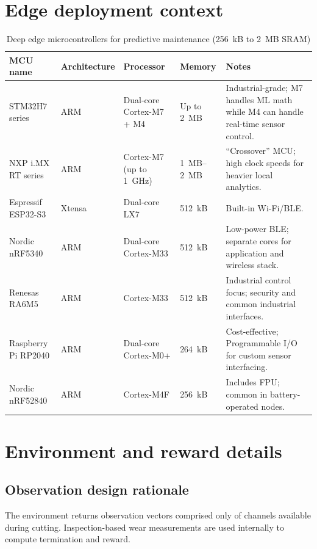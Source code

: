 \documentclass[sn-basic]{sn-jnl} %
\begin{document}
\begin{appendices}

\section{Edge deployment context}
\label{app:edge_context}

\begin{table}[htbp]
	\centering
	\caption{Deep edge microcontrollers for predictive maintenance (256~kB to 2~MB SRAM)}
	\label{tab:deep_edge_mcus}
	\renewcommand{\arraystretch}{1.3}
	\begin{tabular}{@{} l l l l p{5.5cm} @{}}
		\toprule
		\textbf{MCU name} & \textbf{Architecture} & \textbf{Processor} & \textbf{Memory} & \textbf{Notes} \\
		\midrule
		STM32H7 series & ARM & Dual-core Cortex-M7 + M4 & Up to 2~MB & Industrial-grade; M7 handles ML math while M4 can handle real-time sensor control. \\
		NXP i.MX RT series & ARM & Cortex-M7 (up to 1~GHz) & 1~MB--2~MB & ``Crossover'' MCU; high clock speeds for heavier local analytics. \\
		Espressif ESP32-S3 & Xtensa & Dual-core LX7 & 512~kB & Built-in Wi-Fi/BLE.\\
		Nordic nRF5340 & ARM & Dual-core Cortex-M33 & 512~kB & Low-power BLE; separate cores for application and wireless stack. \\
		Renesas RA6M5 & ARM & Cortex-M33 & 512~kB & Industrial control focus; security and common industrial interfaces. \\
		Raspberry Pi RP2040 & ARM & Dual-core Cortex-M0+ & 264~kB & Cost-effective; Programmable I/O for custom sensor interfacing. \\
		Nordic nRF52840 & ARM & Cortex-M4F & 256~kB & Includes FPU; common in battery-operated nodes. \\
		\bottomrule
	\end{tabular}
\end{table}

\section{Environment and reward details}
\label{app:env_reward}
\subsection{Observation design rationale}
The environment returns observation vectors comprised only of channels available during cutting. Inspection-based wear measurements are used internally to compute termination and reward.


\end{appendices}
\end{document}
